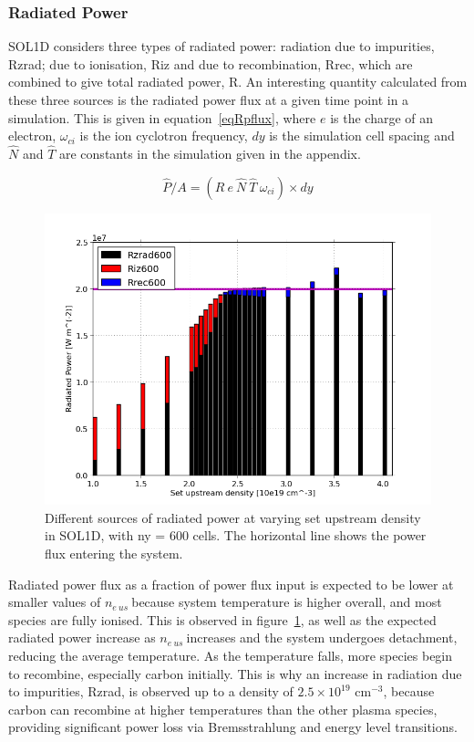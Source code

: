 \documentclass[11pt]{article}  %
\providecommand{\noNe}[1]{{${#1}\times 10^{19}$ cm$^{-3}$}} %
\providecommand{\neus}{$n_{e~us}~$} %
\begin{document}
\subsubsection{Radiated Power}\label{sssecRpower}
SOL1D considers three types of radiated power: radiation due to impurities, Rzrad; due to ionisation, Riz and due to recombination, Rrec, which are combined to give total radiated power, R. An interesting quantity calculated from these three sources is the radiated power flux at a given time point in a simulation. This is given in equation~\ref{eqRpflux}, where $e$ is the charge of an electron, $\omega_{ci}$ is the ion cyclotron frequency, $dy$ is the simulation cell spacing and $\hat{N}$ and $\hat{T}$ are constants in the simulation given in the appendix. 

\begin{equation}\label{eqRpflux}
\hat{P}/A = (R~e~\hat{N}~\hat{T}~\omega_{ci}) \times dy
\end{equation}

\begin{figure}
\includegraphics[scale=0.5]{Figures/sol1d/PRbar600.png}
\centering
\caption{Different sources of radiated power at varying set upstream density in SOL1D, with ny = 600 cells. The horizontal line shows the power flux entering the system.}\label{figPRbar600}
\end{figure}

Radiated power flux as a fraction of power flux input is expected to be lower at smaller values of \neus because system temperature is higher overall, and most species are fully ionised. This is observed in figure~\ref{figPRbar600}, as well as the expected radiated power increase as \neus increases and the system undergoes detachment, reducing the average temperature. As the temperature falls, more species begin to recombine, especially carbon initially. This is why an increase in radiation due to impurities, Rzrad, is observed up to a density of \noNe{2.5}, because carbon can recombine at higher temperatures than the other plasma species, providing significant power loss via Bremsstrahlung and energy level transitions.
\end{document}
